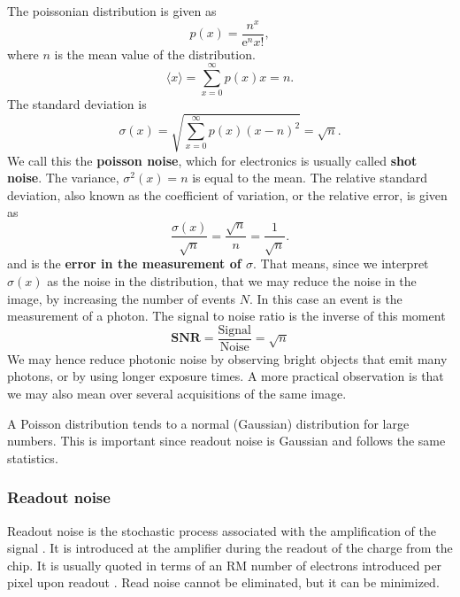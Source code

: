 \documentclass[../main.tex]{subfiles}
\begin{document}
	The poissonian distribution is given as\cite{observationelastronomi}
	\begin{equation}
		p(x) = \frac{n^x}{\mathrm{e}^n x!},
	\end{equation}
	where $n$ is the mean value of the distribution.
	\begin{equation}
		\langle x \rangle = \sum_{x=0}^\infty p(x) x = n.
	\end{equation}
	The standard deviation is\cite{observationelastronomi}
	\begin{equation}
		\sigma(x) = \sqrt{\sum_{x=0}^\infty p(x)(x-n)^2} = \sqrt{n}.
	\end{equation}
	We call this the \textbf{poisson noise}, which for electronics is usually called \textbf{shot noise}. The variance, $\sigma^2(x) = n$ is equal to the mean. The relative standard deviation, also known as the coefficient of variation, or the relative error, is given as 
	\begin{equation}
		\frac{\sigma(x)}{\sqrt{n}}= \frac{\sqrt{n}}{n} = \frac{1}{\sqrt{n}}.
	\end{equation}
	and is the \textbf{error in the measurement of $\sigma$}. That means, since we interpret $\sigma(x)$ as the noise in the distribution, that we may reduce the noise in the image, by increasing the number of events $N$. In this case an event is the measurement of a photon. The signal to noise ratio is the inverse of this moment\cite{SNRdef}
	\begin{equation}
		\textbf{SNR} = \frac{\text{Signal}}{\text{Noise}} = \sqrt{n}
	\end{equation}
	We may hence reduce photonic noise by observing bright objects that emit many photons, or by using longer exposure times. A more practical observation is that we may also mean over several acquisitions of the same image.
	
	A Poisson distribution tends to a normal (Gaussian) distribution for large numbers\cite{handbookofccdastronomy}. This is important since readout noise is Gaussian and follows the same statistics.
	
	\subsubsection{Readout noise}\label{ron}
	Readout noise is the stochastic process associated with the amplification of the signal \cite{handbookofccdastronomy}. It is introduced at the amplifier during the readout of the charge from the chip. It is usually quoted in terms of an RM number of electrons introduced per pixel upon readout \cite{handbookofccdastronomy}. Read noise cannot be eliminated, but it can be minimized. 
	
\end{document}
